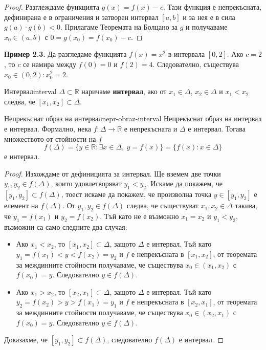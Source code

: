 \begin{proof}
Разглеждаме функцията $g(x) = f(x) - c$. Тази функция е непрекъсната, дефинирана е в ограничения и затворен интервал $[a, b]$ и за нея е в сила $g(a) \cdot g(b) < 0$. Прилагаме Теоремата на Болцано за $g$ и получаваме $x_0 \in (a, b)$ с $0 = g(x_0) = f(x_0) - c$.
\end{proof}

\noindent\textbf{Пример 2.3.} Да разгледаме функцията $f(x) = x^2$ в интервала $[0, 2]$. Ако $c = 2$, то $c$ се намира между $f(0) = 0$ и $f(2) = 4$. Следователно, съществува $x_0 \in (0, 2) : x_0^2 = 2$.

\begin{definition}{Интервал}{interval}
$\Delta \subset \mathbb{R}$ наричаме \textbf{интервал}, ако от $x_1 \in \Delta$, $x_2 \in \Delta$ и $x_1 < x_2$ следва, че $[x_1, x_2] \subset \Delta$.
\end{definition}

\begin{corollary}{Непрекъснат образ на интервал}{nepr-obraz-interval}
Непрекъснат образ на интервал е интервал. Формално, нека $f : \Delta \to \mathbb{R}$ е непрекъсната и $\Delta$ е интервал. Тогава множеството от стойности на $f$
\[
f(\Delta) = \{y \in \mathbb{R} : \exists x \in \Delta,\ y = f(x)\} = \{f(x) : x \in \Delta\}
\]
е интервал.
\end{corollary}

\begin{proof}
Изхождаме от дефиницията за интервал. Ще вземем две точки $y_1, y_2 \in f(\Delta)$, които удовлетворяват $y_1 < y_2$. Искаме да покажем, че $[y_1, y_2] \subset f(\Delta)$, тоест искаме да покажем, че произволна точка $y \in [y_1, y_2]$ е елемент на $f(\Delta)$. От $y_1, y_2 \in f(\Delta)$ следва, че съществуват $x_1, x_2 \in \Delta$ такива, че $y_1 = f(x_1)$ и $y_2 = f(x_2)$. Тъй като не е възможно $x_1 = x_2$ и $y_1 < y_2$, възможни са само следните два случая:
\begin{itemize}
    \item Ако $x_1 < x_2$, то $[x_1, x_2] \subset \Delta$, защото $\Delta$ е интервал. Тъй като $y_1 = f(x_1) < y < f(x_2) = y_2$ и $f$ е непрекъсната в $[x_1, x_2]$, от теоремата за междинните стойности получаваме, че съществува $x_0 \in (x_1, x_2)$ с $f(x_0) = y$. Следователно $y \in f(\Delta)$.
    \item Ако $x_1 > x_2$, то $[x_2, x_1] \subset \Delta$, защото $\Delta$ е интервал. Тъй като $y_2 = f(x_2) > y > f(x_1) = y_1$ и $f$ е непрекъсната в $[x_2, x_1]$, от теоремата за междинните стойности получаваме, че съществува $x_0 \in (x_2, x_1)$ с $f(x_0) = y$. Следователно $y \in f(\Delta)$.
\end{itemize}
Доказахме, че $[y_1, y_2] \subset f(\Delta)$, следователно $f(\Delta)$ е интервал.
\end{proof}

